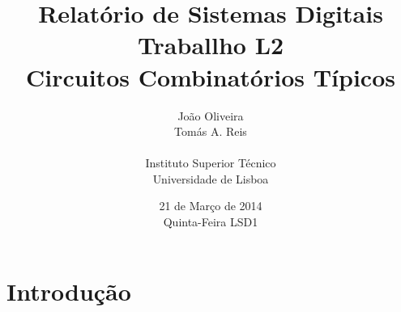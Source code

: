 \documentclass[a4paper,12pt]{article}
\begin{document}
\renewcommand{\sfdefault}{lmss}
\renewcommand{\familydefault}{\sfdefault}
\selectfont

\title{\bf Relatório de Sistemas Digitais \\
Traballho L2\\
Circuitos Combinatórios Típicos}
\author{João Oliveira\\
Tomás A. Reis\\
\\
Instituto Superior Técnico \\
Universidade de Lisboa}
\date{21 de Março de 2014 \\
Quinta-Feira LSD1}
\maketitle

\pagebreak
\section{Introdução}
\end{document}
